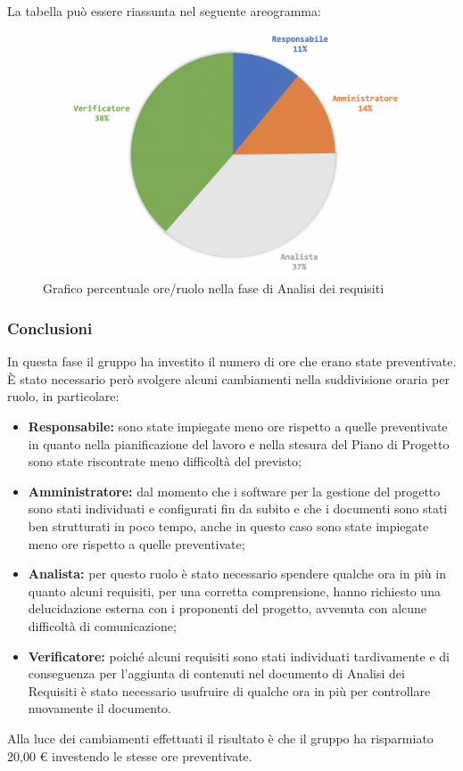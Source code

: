 			La tabella può essere riassunta nel seguente areogramma:
			\begin{figure}[H]
				\centering
				\includegraphics[width=0.8\linewidth]{./images/analisiCons2.png}
				\caption{Grafico percentuale ore/ruolo nella fase di Analisi dei requisiti}
				\label{fig:grafico costi ruolo fase Analisi}
			\end{figure}
		
		\subsubsection{Conclusioni}
			In questa fase il gruppo ha investito il numero di ore che erano state preventivate. È stato necessario però svolgere alcuni cambiamenti nella suddivisione oraria per ruolo, in particolare:
			\begin{itemize}
				\item \textbf{Responsabile:} sono state impiegate meno ore rispetto a quelle preventivate in quanto nella pianificazione del lavoro e nella stesura del Piano di Progetto sono state riscontrate meno difficoltà del previsto;	 
				\item \textbf{Amministratore:} dal momento che i software per la gestione del progetto sono stati individuati e configurati fin da subito e che i documenti sono stati ben strutturati in poco tempo, anche in questo caso sono state impiegate meno ore rispetto a quelle preventivate;	 
				\item \textbf{Analista:} per questo ruolo è stato necessario spendere qualche ora in più in quanto alcuni requisiti, per una corretta comprensione, hanno richiesto una delucidazione esterna con i proponenti del progetto, avvenuta con alcune difficoltà di comunicazione;
				\item \textbf{Verificatore:} poiché alcuni requisiti sono stati individuati tardivamente e di conseguenza per l'aggiunta di contenuti nel documento di Analisi dei Requisiti è stato necessario usufruire di qualche ora in più per controllare nuovamente il documento.
			\end{itemize}
			Alla luce dei cambiamenti effettuati il risultato è che il gruppo ha risparmiato 20,00 € investendo le stesse ore preventivate.
			\pagebreak
			
